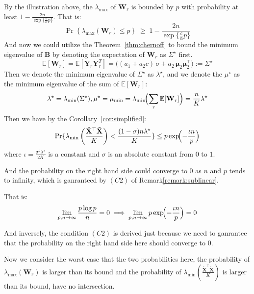 \documentclass{beamer}
\theoremstyle{remark}
\begin{document}
\begin{frame}
By the illustration above, the $\lambda_{\max}$ of $\mathbf{W}_r$ is bounded by $p$ with probability at least $1 - \frac{2 n}{\exp\bigl\{\frac{c}{\alpha} p\bigr\}}$.  
That is:
\[
    \Pr{\left\{\lambda_{\max}(\mathbf{W}_r) \leq p\right\}} \;\ge\; 1 - \frac{2 n}{\exp\bigl\{\frac{c}{\alpha} p\bigr\}}
\]
And now we could utilize the Theorem~\ref{thm:chernoff} to bound the minimum eigenvalue of $\mathbf{B}$ by denoting the expectation of $\mathbf{W}_r$ as $\Sigma^{\star}$ first.
\[
    \mathbb{E}[\mathbf{W}_r] = \mathbb{E}[\mathbf{Y}_r\mathbf{Y}_r^T] = \bigl((a_{1}+a_{2}c)\,\sigma + a_{2}\,\boldsymbol\mu_{2}\boldsymbol\mu_{2}^{\!\top}\bigr) := \Sigma^{\star}
\]
Then we denote the minimum eigenvalue of \(\Sigma^{\star}\) as \(\lambda^{\star}\), and we denote the $\mu^{\star}$ as the minimum eigenvalue of the sum of \(\mathbb{E}[\mathbf{W}_r]\):
\[
    \lambda^{\star} = \lambda_{\min}(\Sigma^{\star}),
    \mu^{\star} = \mu_{\min} = \lambda_{\min}\!\Bigl(\sum_r\mathbb E[\mathbf W_r]\Bigr) = \frac{n}{K}\lambda^{\star}
\]
Then we have by the Corollary~\ref{cor:simplified}:
\[
    \Pr\{\lambda_{\min}\left(\frac{\tilde{\mathbf{X}}^{\top}\tilde{\mathbf{X}}}{K}\right)<\frac{(1-\sigma)n\lambda^{\star}}{K}\}
        \le p\exp\!\Bigl(-\frac{\iota n}{p}\Bigr)
\]
where $\iota = \frac{\sigma^{2}\lambda^{\star}}{2 K}$ is a constant and $\sigma$ is an absolute constant from $0$ to $1$.
\end{frame}
\begin{frame}
And the probability on the right hand side could converge to 0 as $n$ and $p$ tends to infinity, which is ganranteed by $(C2)$ of Remark\ref{remark:sublinear}.

That is:
\[
\lim_{p,n \to \infty} \frac{p \log p}{n} = 0 \implies  \lim_{p,n \to \infty} p\exp\!\Bigl(-\frac{\iota n}{p}\Bigr) = 0
\]

And inversely, the condition $(C2)$ is derived just because we need to ganrantee that the probability on the right hand side here should converge to 0.

Now we consider the worst case that the two probabilities here, the probability of $\lambda_{\max}(\mathbf{W}_r)$ is larger than its bound and the probability of $\lambda_{\min}(\frac{\tilde{\mathbf{X}}^{\top}\tilde{\mathbf{X}}}{K})$ is larger than its bound, have no intersection.
\end{frame}
\end{document}
